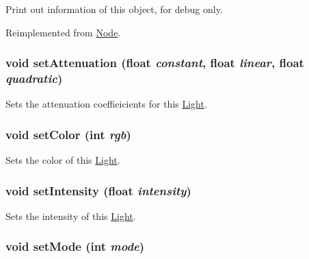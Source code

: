 Print out information of this object, for debug only. 

Reimplemented from \hyperlink{classm3g_1_1Node_6fea17fa1532df3794f8cb39cb4f911f}{Node}.\hypertarget{classm3g_1_1Light_391c5cff137fc2e810f5129a5381196f}{
\subsubsection[{setAttenuation}]{\setlength{\rightskip}{0pt plus 5cm}void setAttenuation (float {\em constant}, \/  float {\em linear}, \/  float {\em quadratic})}}
\label{classm3g_1_1Light_391c5cff137fc2e810f5129a5381196f}


Sets the attenuation coeffieicients for this \hyperlink{classm3g_1_1Light}{Light}. \hypertarget{classm3g_1_1Light_b1f5cc0f5cc6bbbd716a526c61f1081d}{
\subsubsection[{setColor}]{\setlength{\rightskip}{0pt plus 5cm}void setColor (int {\em rgb})}}
\label{classm3g_1_1Light_b1f5cc0f5cc6bbbd716a526c61f1081d}


Sets the color of this \hyperlink{classm3g_1_1Light}{Light}. \hypertarget{classm3g_1_1Light_ce02325cb6289c007d569c193641c468}{
\subsubsection[{setIntensity}]{\setlength{\rightskip}{0pt plus 5cm}void setIntensity (float {\em intensity})}}
\label{classm3g_1_1Light_ce02325cb6289c007d569c193641c468}


Sets the intensity of this \hyperlink{classm3g_1_1Light}{Light}. \hypertarget{classm3g_1_1Light_9f407b18ba6235cb96fa95611c1ea3a4}{
\subsubsection[{setMode}]{\setlength{\rightskip}{0pt plus 5cm}void setMode (int {\em mode})}}
\label{classm3g_1_1Light_9f407b18ba6235cb96fa95611c1ea3a4}


